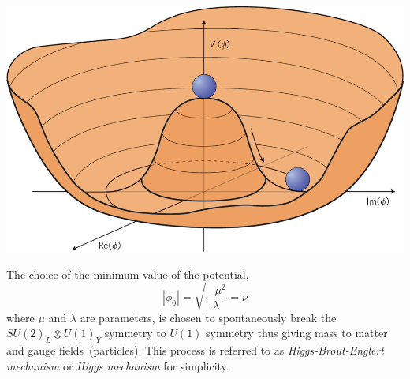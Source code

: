 \begin{center}
\centering
\includegraphics[scale=0.3]{THESISPLOTS/Higgs_Potential.jpg}
\label{fig:Higgs}
\end{center}




The choice of the minimum value of the potential, $$|\phi_{0}| = \sqrt{\frac{-\mu^{2}}{\lambda}}  = \nu $$ where $\mu$ and $ \lambda$ are parameters, is chosen to spontaneously break the $SU(2)_{L} \otimes U(1)_{Y}$ symmetry to $U(1)$ symmetry thus giving mass to matter and gauge fields~(particles). This process is referred to as \textit{Higgs-Brout-Englert mechanism} or \textit{Higgs mechanism} for simplicity.



